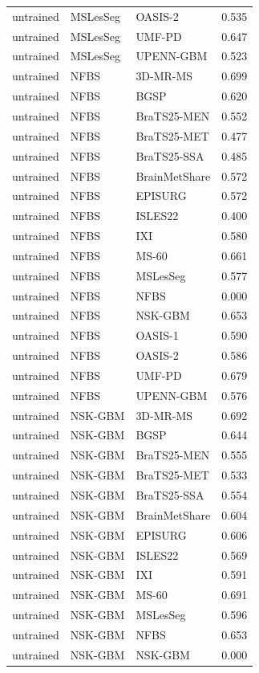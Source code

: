 \begin{tabular}{lllr}
untrained & MSLesSeg & OASIS-2 & 0.535 \\
untrained & MSLesSeg & UMF-PD & 0.647 \\
untrained & MSLesSeg & UPENN-GBM & 0.523 \\
untrained & NFBS & 3D-MR-MS & 0.699 \\
untrained & NFBS & BGSP & 0.620 \\
untrained & NFBS & BraTS25-MEN & 0.552 \\
untrained & NFBS & BraTS25-MET & 0.477 \\
untrained & NFBS & BraTS25-SSA & 0.485 \\
untrained & NFBS & BrainMetShare & 0.572 \\
untrained & NFBS & EPISURG & 0.572 \\
untrained & NFBS & ISLES22 & 0.400 \\
untrained & NFBS & IXI & 0.580 \\
untrained & NFBS & MS-60 & 0.661 \\
untrained & NFBS & MSLesSeg & 0.577 \\
untrained & NFBS & NFBS & 0.000 \\
untrained & NFBS & NSK-GBM & 0.653 \\
untrained & NFBS & OASIS-1 & 0.590 \\
untrained & NFBS & OASIS-2 & 0.586 \\
untrained & NFBS & UMF-PD & 0.679 \\
untrained & NFBS & UPENN-GBM & 0.576 \\
untrained & NSK-GBM & 3D-MR-MS & 0.692 \\
untrained & NSK-GBM & BGSP & 0.644 \\
untrained & NSK-GBM & BraTS25-MEN & 0.555 \\
untrained & NSK-GBM & BraTS25-MET & 0.533 \\
untrained & NSK-GBM & BraTS25-SSA & 0.554 \\
untrained & NSK-GBM & BrainMetShare & 0.604 \\
untrained & NSK-GBM & EPISURG & 0.606 \\
untrained & NSK-GBM & ISLES22 & 0.569 \\
untrained & NSK-GBM & IXI & 0.591 \\
untrained & NSK-GBM & MS-60 & 0.691 \\
untrained & NSK-GBM & MSLesSeg & 0.596 \\
untrained & NSK-GBM & NFBS & 0.653 \\
untrained & NSK-GBM & NSK-GBM & 0.000 \\

\end{tabular}
